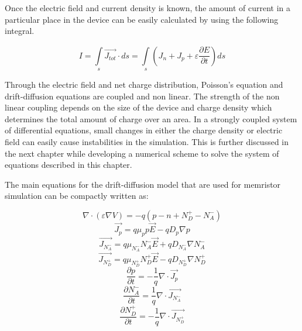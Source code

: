 \begin{doublespace}
Once the electric field and current density is known, the amount of current in a particular place in the device can be easily calculated by using the following integral.

\begin{equation}
I=\int\limits_{s}^{}\vec{J_{tot}} \cdot ds = \int\limits_{s}^{}(J_n+J_p+\varepsilon\frac{\partial E}{\partial t})ds
\end{equation}


Through the electric field and net charge distribution, Poisson's equation and drift-diffusion equations are coupled and non linear. The strength of the non linear coupling depends on the size of the device and charge density which determines the total amount of charge over an area. In a strongly coupled system of differential equations, small changes in either the charge density or electric field can easily cause instabilities in the simulation. This is further discussed in the next chapter while developing a numerical scheme to solve the system of equations described in this chapter. 

The main equations for the drift-diffusion model that are used for memristor simulation can be compactly written as:

\begin{equation}
\nabla \cdot  (\varepsilon \nabla V)=-q(p-n+N_{D}^{+}-N_{A}^{-})
\end{equation}
\begin{equation}
\vec{J_p}=q\mu_p p \vec{E}-q D_p \nabla p
\end{equation}
\begin{equation}
\vec{J_{N_{A}^{-}}}=q\mu_{N_{A}^{-}} N_{A}^{-} \vec{E}+q D_{N_{A}^{-}} \nabla N_{A}^{-}
\end{equation}
\begin{equation}
\vec{J_{N_{D}^{+}}}=q\mu_{N_{D}^{+}} N_{D}^{+} \vec{E}-q D_{N_{D}^{+}} \nabla N_{D}^{+}
\end{equation}
\begin{equation}
\frac{\partial p}{\partial t}=-\frac{1}{q}\nabla \cdot \vec{J_p}
\end{equation}
\begin{equation}
\frac{\partial N_{A}^{-}}{\partial t}=\frac{1}{q}\nabla \cdot \vec{J_{N_{A}^{-}}}
\end{equation}
\begin{equation}
\frac{\partial N_{D}^{+}}{\partial t}=-\frac{1}{q}\nabla \cdot \vec{J_{N_{D}^{+}}}
\end{equation}


\end{doublespace}
